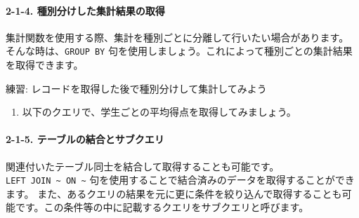 \begin{Shaded}
\begin{Highlighting}[]
 
 
\end{Highlighting}
\end{Shaded}

\paragraph{2-1-4.
種別分けした集計結果の取得}\label{ux7a2eux5225ux5206ux3051ux3057ux305fux96c6ux8a08ux7d50ux679cux306eux53d6ux5f97}

集計関数を使用する際、集計を種別ごとに分離して行いたい場合があります。\\
そんな時は、\texttt{GROUP\ BY}
句を使用しましょう。これによって種別ごとの集計結果を取得できます。

練習: レコードを取得した後で種別分けして集計してみよう

\begin{enumerate}
\def\labelenumi{\arabic{enumi}.}
\tightlist
\item
  以下のクエリで、学生ごとの平均得点を取得してみましょう。
\end{enumerate}

\begin{Shaded}
\begin{Highlighting}[]
\NormalTok{(}\OperatorTok{*}\NormalTok{) }
 
\end{Highlighting}
\end{Shaded}

\paragraph{2-1-5.
テーブルの結合とサブクエリ}\label{ux30c6ux30fcux30d6ux30ebux306eux7d50ux5408ux3068ux30b5ux30d6ux30afux30a8ux30ea}

関連付いたテーブル同士を結合して取得することも可能です。\\
\texttt{LEFT\ JOIN\ \textasciitilde{}\ ON\ \textasciitilde{}}
句を使用することで結合済みのデータを取得することができます。
また、あるクエリの結果を元に更に条件を絞り込んで取得することも可能です。この条件等の中に記載するクエリをサブクエリと呼びます。

